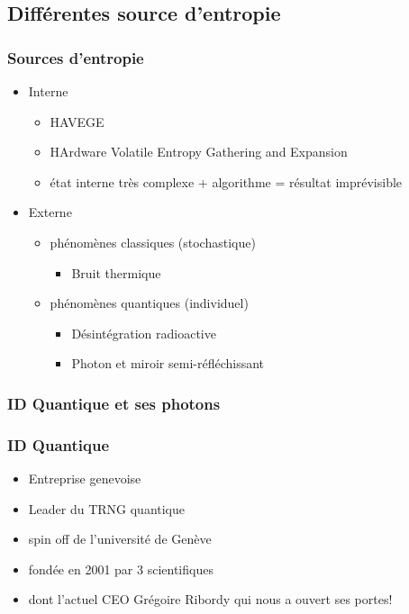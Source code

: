 \documentclass{beamer}
\begin{document}
\subsection{Différentes source d'entropie}
\begin{frame}
\frametitle{Sources d'entropie}
 \begin{itemize}
 \item Interne
  \begin{itemize}
  \item<2-> HAVEGE
  \item<3-> HArdware Volatile Entropy Gathering and Expansion
  \item<4-> état interne très complexe + algorithme = résultat imprévisible
  \end{itemize}
 \item Externe
  \begin{itemize}
  \item<5-> phénomènes classiques (stochastique)
   \begin{itemize}
   \item<6-> Bruit thermique
   \end{itemize}
  \item<5-> phénomènes quantiques (individuel)
   \begin{itemize}
   \item<7-> Désintégration radioactive
   \item<8-> Photon et miroir semi-réfléchissant 
   \end{itemize}
  \end{itemize}
 \end{itemize}
\end{frame}


\subsubsection{ID Quantique et ses photons}
\begin{frame}
\frametitle{ID Quantique}
 \begin{itemize}
 \item Entreprise genevoise
 \item<2-> Leader du TRNG quantique
 \item<3-> spin off de l’université de Genève
 \item<4-> fondée en 2001 par 3 scientifiques
 \item<5-> dont l’actuel CEO Grégoire Ribordy qui nous a ouvert ses portes! 
 \end{itemize}
\end{frame}
\end{document}
